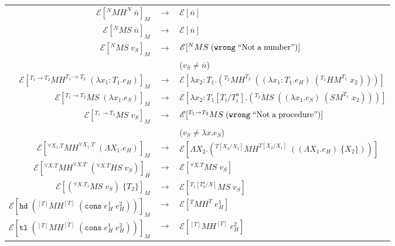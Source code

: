 \begin{figure}
\onehalfspacing
\begin{center}
\begin{tabular}{rcl}
$\mathscr{E}[^{N}MH^{N}\;\overline{n}]_{M}$ & $\rightarrow$ & $\mathscr{E}[\overline{n}]$ \\
$\mathscr{E}[^{N}MS\;\overline{n}]_{M}$ & $\rightarrow$ & $\mathscr{E}[\overline{n}]$ \\
$\mathscr{E}[^{N}MS\;v_{S}]_{M}$ & $\rightarrow$ & $\mathscr{E}[^{N}MS\;(\mathtt{wrong}\;\mathrm{``Not\;a\;number"})]$ \\
&& ($v_{S}\neq\overline{n}$) \\
$\mathscr{E}[^{T_{1}\rightarrow T_{2}}MH^{T_{1}\rightarrow T_{2}}\;(\lambda x_{1}:T_{1}.e_{H})]_{M}$ & $\rightarrow$ & $\mathscr{E}[\lambda x_{2}:T_{1}.(^{T_{2}}MH^{T_{2}}\;((\lambda x_{1}:T_{1}.e_{H})\;(^{T_{1}}HM^{T_{1}}\;x_{2})))]$ \\
$\mathscr{E}[^{T_{1}\rightarrow T_{2}}MS\;(\lambda x_{1}.e_{S})]_{M}$ & $\rightarrow$ & $\mathscr{E}[\lambda x_{2}:T_{1}[T_{i}/T^{a}_{i}].(^{T_{2}}MS\;((\lambda x_{1}.e_{S})\;(SM^{T_{1}}\;x_{2})))]$ \\
$\mathscr{E}[^{T_{1}\rightarrow T_{2}}MS\;v_{S}]_{M}$ & $\rightarrow$ & $\mathscr{E}[^{T_{1}\rightarrow T_{2}}MS\;(\mathtt{wrong}\;\mathrm{``Not\;a\;procedure"})]$ \\
&& ($v_{S}\neq\lambda x.e_{S}$) \\
$\mathscr{E}[^{\forall X_{1}.T}MH^{\forall X_{1}.T}\;(\Lambda X_{1}.e_{H})]_{M}$ & $\rightarrow$ & $\mathscr{E}[\Lambda X_{2}.(^{T[X_{2}/X_{1}]}MH^{T[X_{2}/X_{1}]}\;((\Lambda X_{1}.e_{H})\;\lbrace X_{2}\rbrace))]$ \\
$\mathscr{E}[^{\forall X.T}MH^{\forall X.T}\;(^{\forall X.T}HS\;v_{S})]_{H}$ & $\rightarrow$ & $\mathscr{E}[^{\forall X.T}MS\;v_{S}]$ \\
$\mathscr{E}[(^{\forall X.T_{1}}MS\;v_{S})\;\lbrace T_{2}\rbrace]_{M}$ & $\rightarrow$ & $\mathscr{E}[^{T_{1}[T^{a}_{2}/X]}MS\;v_{S}]$ \\
$\mathscr{E}[\mathtt{hd}\;(^{[T]}MH^{[T]}\;(\mathtt{cons}\;e_{H}^{1}\;e_{H}^{2}))]_{M}$ & $\rightarrow$ & $\mathscr{E}[^{T}MH^{T}\;e_{H}^{1}]$ \\
$\mathscr{E}[\mathtt{tl}\;(^{[T]}MH^{[T]}\;(\mathtt{cons}\;e_{H}^{1}\;e_{H}^{2}))]_{M}$ & $\rightarrow$ & $\mathscr{E}[^{[T]}MH^{[T]}\;e_{H}^{2}]$ \\

\end{tabular}
\end{center}
\end{figure}
